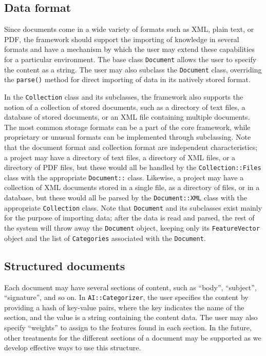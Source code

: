 \documentclass[a4paper,twocolumn]{article}
\begin{document}
\subsection*{Data format}
Since documents come in a wide variety of formats such as XML, plain text,
or PDF, the framework should support the
importing of knowledge in several formats and have a mechanism by
which the user may extend these capabilities for a particular
environment.  The base class \texttt{Document} allows the user to
specify the content as a string.  The user may also subclass the
\texttt{Document} class, overriding the \texttt{parse()} method for
direct importing of data in its natively stored format.

In the \texttt{Collection} class and its subclasses, the framework
also supports the notion of a collection of stored documents, such as
a directory of text files, a database of stored documents, or an XML
file containing multiple documents.  The most common storage formats
can be a part of the core framework, while proprietary or unusual
formats can be implemented through subclassing.  Note that the
document format and collection format are independent characteristics;
a project may have a directory of text files, a directory of XML
files, or a directory of PDF files, but these would all be handled by
the \texttt{Collection::Files} class with the appropriate
\texttt{Document::} class.  Likewise, a project may have a collection
of XML documents stored in a single file, as a directory of files, or
in a database, but these would all be parsed by the
\texttt{Document::XML} class with the appropriate \texttt{Collection}
class. Note that \texttt{Document} and its subclasses exist mainly for
the purpose of importing data; after the data is read and parsed, the
rest of the system will throw away the \texttt{Document} object,
keeping only its \texttt{FeatureVector} object and the list of
\texttt{Categories} associated with the \texttt{Document}.

\subsection*{Structured documents}
Each document may have several sections of content, such as ``body'',
``subject'', ``signature'', and so on.  In \texttt{AI::Categorizer},
the user specifies the content by providing a hash of key-value pairs,
where the key indicates the name of the section, and the value is a
string containing the content data.  The user may also specify
``weights'' to assign to the features found in each section.  In the
future, other treatments for the different sections of a document may
be supported as we develop effective ways to use
this structure.
\end{document}
